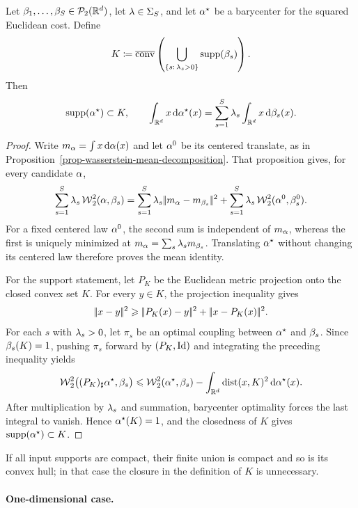 \begin{prop}\label{prop-w2-barycenter-mean-support}
	Let $\beta_1,\ldots,\beta_S\in\mathcal{P}_2(\mathbb{R}^d)$, let $\lambda\in\Sigma_S$, and let $\alpha^\star$ be a barycenter for the squared Euclidean cost. Define
	\[
		K
		\coloneqq
		\overline{\operatorname{conv}}
		\left(
			\bigcup_{\{s:\,\lambda_s>0\}}\operatorname{supp}(\beta_s)
		\right).
	\]
	Then
	\[
		\operatorname{supp}(\alpha^\star)\subset K,
		\qquad
		\int_{\mathbb{R}^d}x\,\mathrm{d}\alpha^\star(x)
		=
		\sum_{s=1}^S\lambda_s\int_{\mathbb{R}^d}x\,\mathrm{d}\beta_s(x).
	\]
\end{prop}
\begin{proof}
	Write $m_\alpha=\int x\,\mathrm{d}\alpha(x)$ and let $\alpha^0$ be its centered translate, as in Proposition~\ref{prop-wasserstein-mean-decomposition}. That proposition gives, for every candidate $\alpha$,
	\[
		\sum_{s=1}^S\lambda_s\operatorname{\mathcal{W}}_2^2(\alpha,\beta_s)
		=
		\sum_{s=1}^S\lambda_s|\!| m_\alpha-m_{\beta_s} |\!|^2
		+\sum_{s=1}^S\lambda_s\operatorname{\mathcal{W}}_2^2(\alpha^0,\beta_s^0).
	\]
	For a fixed centered law $\alpha^0$, the second sum is independent of $m_\alpha$, whereas the first is uniquely minimized at
	$m_\alpha=\sum_s\lambda_s m_{\beta_s}$. Translating $\alpha^\star$ without changing its centered law therefore proves the mean identity.

	For the support statement, let $P_K$ be the Euclidean metric projection onto the closed convex set $K$. For every $y\in K$, the projection inequality gives
	\[
		|\!| x-y |\!|^2
		\geqslant
		|\!| P_K(x)-y |\!|^2+|\!| x-P_K(x) |\!|^2.
	\]
	For each $s$ with $\lambda_s>0$, let $\pi_s$ be an optimal coupling between $\alpha^\star$ and $\beta_s$. Since $\beta_s(K)=1$, pushing $\pi_s$ forward by $(P_K,\mathrm{Id})$ and integrating the preceding inequality yields
	\[
		\operatorname{\mathcal{W}}_2^2\bigl((P_K)_\sharp\alpha^\star,\beta_s\bigr)
		\leqslant
		\operatorname{\mathcal{W}}_2^2(\alpha^\star,\beta_s)
		-
		\int_{\mathbb{R}^d}\operatorname{dist}(x,K)^2\,\mathrm{d}\alpha^\star(x).
	\]
	After multiplication by $\lambda_s$ and summation, barycenter optimality forces the last integral to vanish. Hence $\alpha^\star(K)=1$, and the closedness of $K$ gives $\operatorname{supp}(\alpha^\star)\subset K$.
\end{proof}
If all input supports are compact, their finite union is compact and so is its convex hull; in that case the closure in the definition of $K$ is unnecessary.

\paragraph{One-dimensional case.}

